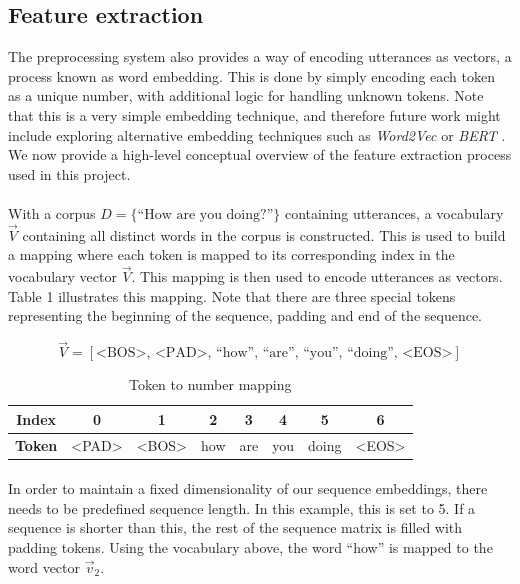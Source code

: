 \documentclass{article}
\begin{document}
\subsection*{Feature extraction}
The preprocessing system also provides a way of encoding utterances as
vectors, a process known as word embedding. This is done by simply
encoding each token as a unique number, with additional logic for handling
unknown tokens. Note that this is a very simple embedding technique, and
therefore future work might include exploring alternative embedding techniques
such as \emph{Word2Vec} \cite{word2vec} or \emph{BERT} \cite{bert2018}.
We now provide a high-level conceptual overview of the feature extraction
process used in this project.

\paragraph{}
With a corpus $D = \{\text{``How are you doing?''}\}$ containing utterances, 
a vocabulary $\vec{V}$ containing all distinct words in the corpus is
constructed. This is used to build a mapping where each token is mapped to
its corresponding index in the vocabulary vector $\vec{V}$. This mapping is
then used to encode utterances as vectors. Table 1 illustrates
this mapping. Note that there are three special tokens representing the
beginning of the sequence, padding and end of the sequence.

$$
   \vec{V} = [ \textrm{<BOS>},\, \textrm{<PAD>},\, \textrm{``how''},\,
               \textrm{``are''},\, \textrm{``you''},\, \textrm{``doing''},\,
               \textrm{<EOS>}]
$$

\begin{table}[hbt]
  \begin{center}
    \begin{tabular}{c|c|c|c|c|c|c|c}
      \textbf{Index} & 0 & 1 & 2 & 3 & 4 & 5 & 6 \\
      \hline
      \textbf{Token} & <PAD> & <BOS> & how & are & you & doing & <EOS> \\
    \end{tabular}
  \end{center}
  \label{tab:tok2num}
  \caption{Token to number mapping}
\end{table}

\paragraph{}
In order to maintain a fixed dimensionality of our sequence embeddings, there
needs to be predefined sequence length. In this example, this is set to 5. If a
sequence is shorter than this, the rest of the sequence matrix is filled with
padding tokens. Using the vocabulary above, the word ``how'' is mapped to the
word vector $\vec{v}_2$.
\end{document}
